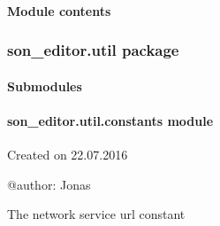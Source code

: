 \documentclass[letterpaper,10pt,english]{sphinxmanual}
\begin{document}
\paragraph{Module contents}
\label{_source/son_editor.models:module-son_editor.models}\label{_source/son_editor.models:module-contents}

\subsubsection{son\_editor.util package}
\label{_source/son_editor.util::doc}\label{_source/son_editor.util:son-editor-util-package}

\paragraph{Submodules}
\label{_source/son_editor.util:submodules}

\paragraph{son\_editor.util.constants module}
\label{_source/son_editor.util:son-editor-util-constants-module}\label{_source/son_editor.util:module-son_editor.util.constants}
Created on 22.07.2016

@author: Jonas

\begin{fulllineitems}
\label{_source/son_editor.util:son_editor.util.constants.CATALOGUES}
The network service url constant

\end{fulllineitems}

\end{document}
